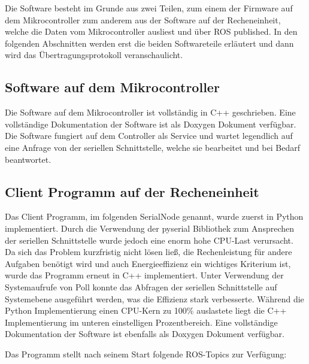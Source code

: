 Die Software besteht im Grunde aus zwei Teilen, zum einem der Firmware auf dem Mikrocontroller zum anderem aus der Software auf der Recheneinheit, welche die Daten vom Mikrocontroller ausliest und über ROS published.
In den folgenden Abschnitten werden erst die beiden Softwareteile erläutert und dann wird das Übertragungsprotokoll ver\-an\-schau\-licht.


\subsection{Software auf dem Mikrocontroller}
Die Software auf dem Mikrocontroller ist vollständig in C++ geschrieben. Eine vollständige Dokumentation der Software ist als Doxygen Dokument verfügbar. 
Die Software fungiert auf dem Controller als Service und wartet legendlich auf eine Anfrage von der seriellen Schnittstelle, welche sie bearbeitet und bei Bedarf beantwortet. 


\subsection{Client Programm auf der Recheneinheit}
Das Client Programm, im folgenden SerialNode genannt, wurde zuerst in Python implementiert. Durch die Verwendung der pyserial Bibliothek zum Ansprechen der seriellen Schnittstelle wurde jedoch
eine enorm hohe CPU-Last verursacht. Da sich das Problem kurzfristig nicht lösen ließ, die Rechenleistung für andere Aufgaben benötigt wird und auch Energieeffizienz ein wichtiges Kriterium ist,
wurde das Programm erneut in C++ implementiert. Unter Verwendung der Systemaufrufe von Poll konnte das Abfragen der seriellen Schnittstelle auf Systemebene ausgeführt werden, was die Effizienz stark 
verbesserte. Während die Python Implementierung einen CPU-Kern zu 100\% auslastete liegt die C++ Implementierung im unteren einstelligen Prozentbereich.
Eine vollständige Dokumentation der Software ist ebenfalls als Doxygen Dokument verfügbar.

Das Programm stellt nach seinem Start folgende ROS-Topics zur Ver\-fü\-gung:\\
 
